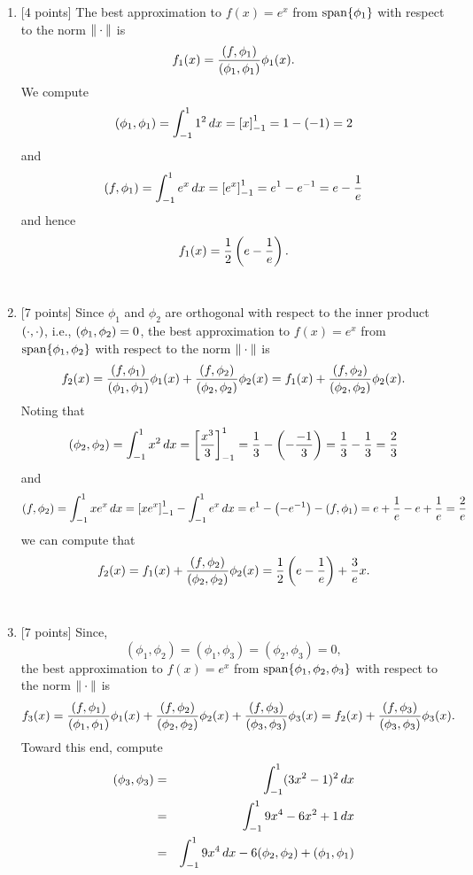 \begin{solution}
\begin{enumerate}
\item {[4 points]} The best approximation to $f(x) = e^x$ from ${\rm span}\{\phi_1\}$ with respect to the norm $\|\cdot\|$ is
       \[ f_1(x) = {(f,\phi_1) \over (\phi_1, \phi_1)} \phi_1(x).\]
      We compute
\[
          (\phi_1,\phi_1) = \int_{-1}^1 1^2\,dx = \left[x\right]_{-1}^1=1-\left(-1\right)=2
\]
and
\[
          (f,\phi_1) = \int_{-1}^1 e^x\,dx = \left[e^x\right]_{-1}^1=e^1-e^{-1}=e-{1\over e}
\]
      and hence
       \[ f_1(x) = {1\over 2}\left(e-{1\over e}\right).\]
\\
\item {[7 points]} Since $\phi_1$ and $\phi_2$ are
      orthogonal with respect to the inner product $(\cdot,\cdot)$, i.e., $(\phi_1, \phi_2) = 0$, the best approximation to $f(x) = e^x$ from ${\rm span}\{\phi_1,\phi_2\}$ with respect to the norm $\|\cdot\|$ is
       \[ f_2(x) = {(f,\phi_1) \over (\phi_1, \phi_1)} \phi_1(x) + {(f,\phi_2) \over (\phi_2, \phi_2)} \phi_2(x) = f_1(x) + {(f,\phi_2) \over (\phi_2, \phi_2)} \phi_2(x).\]
      Noting that
      \[
         (\phi_2,\phi_2) =\int_{-1}^1 x^2\,dx = \left[{x^3\over 3}\right]_{-1}^1 = {1 \over 3} - \left(-{-1 \over 3}\right) = {1 \over 3} - {1 \over 3} = {2\over 3}
\]
and
\[
         (f,\phi_2) =\int_{-1}^1 xe^x\,dx =\left[xe^x\right]_{-1}^1-\int_{-1}^1 e^x\,dx = e^1-\left(-e^{-1}\right)-(f,\phi_1) = e+{1\over e}-e+{1\over e} = {2\over e}
\]
      we can compute that
       \[ f_2(x) = f_1(x)
                  + {(f,\phi_2) \over (\phi_2, \phi_2)} \phi_2(x) = {1\over 2}\left(e-{1\over e}\right)
                  + {3\over e}x.\]
\\
\item {[7 points]}
Since,
 \[ (\phi_1,\phi_2) = (\phi_1,\phi_3) = (\phi_2,\phi_3) = 0,\]
the best approximation to $f(x) = e^x$ from ${\rm span}\{\phi_1,\phi_2,\phi_3\}$ with respect to the norm $\|\cdot\|$ is
       \[ f_3(x) = {(f,\phi_1) \over (\phi_1, \phi_1)} \phi_1(x) + {(f,\phi_2) \over (\phi_2, \phi_2)} \phi_2(x) + {(f,\phi_3) \over (\phi_3, \phi_3)} \phi_3(x) = f_2(x) + {(f,\phi_3) \over (\phi_3, \phi_3)} \phi_3(x).\]
Toward this end, compute
\begin{eqnarray*}
  \ip{\phi_3,\phi_3} &=& \int_{-1}^1 (3x^2-1)^2\,dx
\\
 &=& \int_{-1}^1 9x^4-6x^2+1\,dx
\\
 &=& \int_{-1}^1 9x^4\,dx-6\ip{\phi_2,\phi_2} +\ip{\phi_1,\phi_1}
\\

\end{eqnarray*}
\end{enumerate}
\end{solution}
